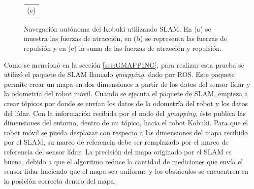 \begin{figure}
\begin{tabular}{c}
      \multicolumn{1}{c}{(c)}
    \end{tabular}
  \captionsetup{font=footnotesize}
    \caption{\label{fig:Kbki_slam}Navegación autónoma del Kobuki utilizando
    SLAM. En (a) se muestra las fuerzas de atracción, en (b) se representa 
    las fuerzas de repulsión y en (c) la suma de las fuerzas de atracción y 
    repulsión.}
\end{figure}


Como se mencionó en la sección \ref{sec:GMAPPING}, para realizar esta prueba se utilizó
el paquete de SLAM llamado \textit{gmapping}, dado por ROS. Este paquete permite crear 
un mapa en dos dimensiones a partir de los datos del sensor lídar y la odometría del 
robot móvil. Cuando se ejecuta el paquete de SLAM, empieza a crear tópicos por donde se
envían los datos de la odometría del robot y los datos del lídar. Con la información 
recibida por el nodo del \textit{gmapping}, éste publica las dimensiones del entorno, dentro
de un tópico, hacia el robot Kobuki. Para que el robot móvil se pueda desplazar con respecto
a las dimensiones del mapa recibido por el SLAM, su marco de referencia debe ser remplazado
por el marco de referencia del sensor lídar. La precisión del mapa originado por el SLAM es 
buena, debido a que el algoritmo reduce la cantidad de mediciones que envía el sensor lídar
haciendo que el mapa sea uniforme y los obstáculos se encuentren en la posición correcta
dentro del mapa.

